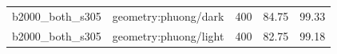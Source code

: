 \begin{longtable}{l>{\raggedright\arraybackslash}p{.42\linewidth}rrr}
b2000\_\allowbreak{}both\_\allowbreak{}s305 & %
geometry:phuong/dark & %
400 & %
84.75 & %
99.33 \\ %

b2000\_\allowbreak{}both\_\allowbreak{}s305 & %
geometry:phuong/light & %
400 & %
82.75 & %
99.18 \\ %


\end{longtable}

